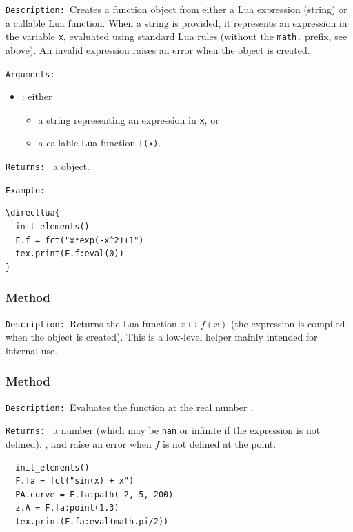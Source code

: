 \texttt{Description: }Creates a function object from either a Lua expression
(string) or a callable Lua function. When a string is provided, it represents
an expression in the variable \texttt{x}, evaluated using standard Lua rules
(without the \texttt{math.} prefix, see above). An invalid expression raises an error when the object is created.

\medskip
\texttt{Arguments: }\par
\begin{itemize}
\item {}: either
  \begin{itemize}
    \item a string representing an expression in \texttt{x}, or
    \item a callable Lua function \texttt{f(x)}.
  \end{itemize}
\end{itemize}

\medskip
\texttt{Returns: } a  object.

\medskip
\texttt{Example: }
\begin{verbatim}
\directlua{
  init_elements()
  F.f = fct("x*exp(-x^2)+1")
  tex.print(F.f:eval(0))
}
\end{verbatim}



\subsubsection{Method }
\label{ssub:method_fct_compile}

\texttt{Description: }Returns the Lua function $x \mapsto f(x)$ (the expression is
compiled when the object is created). This is a low-level helper mainly intended
for internal use.

\subsubsection{Method }
\label{ssub:method_fct_value}

\texttt{Description: }Evaluates the function at the real number .

\medskip
\texttt{Returns: } a number (which may be \texttt{nan} or infinite if the expression is not defined).
,  and  raise an error when $f$ is not defined at the point.

\begin{verbatim}
  init_elements()
  F.fa = fct("sin(x) + x")
  PA.curve = F.fa:path(-2, 5, 200)
  z.A = F.fa:point(1.3)
  tex.print(F.fa:eval(math.pi/2))
\end{verbatim}


